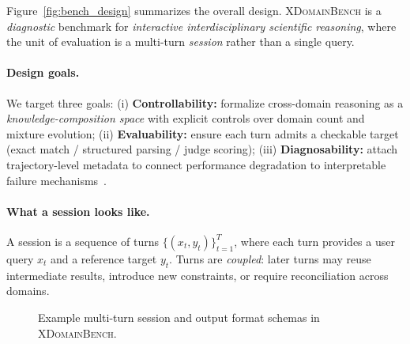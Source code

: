 Figure~\ref{fig:bench_design} summarizes the overall design.
\textsc{XDomainBench} is a \emph{diagnostic} benchmark for \emph{interactive interdisciplinary scientific reasoning}, where the unit of evaluation is a multi-turn \emph{session} rather than a single query.

\paragraph{Design goals.}
We target three goals: (i) \textbf{Controllability:} formalize cross-domain reasoning as a \emph{knowledge-composition space} with explicit controls over domain count and mixture evolution; (ii) \textbf{Evaluability:} ensure each turn admits a checkable target (exact match / structured parsing / judge scoring); (iii) \textbf{Diagnosability:} attach trajectory-level metadata to connect performance degradation to interpretable failure mechanisms~\citep{liang2022helm,ribeiro-etal-2020-beyond,kiela-etal-2021-dynabench,schlangen-2021-targeting}.

\paragraph{What a session looks like.}
A session is a sequence of turns $\{(x_t, y_t)\}_{t=1}^{T}$, where each turn provides a user query $x_t$ and a reference target $y_t$.
Turns are \emph{coupled}: later turns may reuse intermediate results, introduce new constraints, or require reconciliation across domains.

\begin{figure}[t]
  \centering
  \caption{Example multi-turn session and output format schemas in \textsc{XDomainBench}.}
  \label{fig:session_example}
  \vspace{-3mm}
\end{figure}

